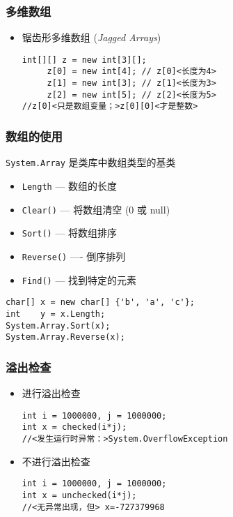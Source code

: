 \begin{frame}[fragile]
\frametitle{多维数组}
\begin{itemize}
\item 锯齿形多维数组 (\textit{Jagged Arrays})
\begin{lstlisting}[escapeinside=<>]
int[][] z = new int[3][];
     z[0] = new int[4]; // z[0]<长度为4>
     z[1] = new int[3]; // z[1]<长度为3>
     z[2] = new int[5]; // z[2]<长度为5>
//z[0]<只是数组变量；>z[0][0]<才是整数>

\end{lstlisting}
\end{itemize} \pause

  \begin{figure}[h] \label<1| handout:1>{fig:cs-array-rec}
    \centering 
  \end{figure}
\end{frame}

\begin{frame}[fragile]
\frametitle{数组的使用}
\texttt{System.Array} 是类库中数组类型的基类

\begin{itemize}
\item \texttt{Length} --- 数组的长度
\item \texttt{Clear()} --- 将数组清空 (0 或 null)
\item \texttt{Sort()} --- 将数组排序
\item \texttt{Reverse()} ---- 倒序排列
\item \texttt{Find()} --- 找到特定的元素
\end{itemize}
\begin{lstlisting}
char[] x = new char[] {'b', 'a', 'c'};
int    y = x.Length;
System.Array.Sort(x);
System.Array.Reverse(x);
\end{lstlisting}

\end{frame}

\begin{frame}[fragile]
\frametitle{溢出检查}
\begin{itemize}
\item 进行溢出检查
\begin{lstlisting}[escapeinside=<>]
int i = 1000000, j = 1000000;
int x = checked(i*j);
//<发生运行时异常：>System.OverflowException

\end{lstlisting}

\item 不进行溢出检查
\begin{lstlisting}[escapeinside=<>]
int i = 1000000, j = 1000000;
int x = unchecked(i*j);
//<无异常出现，但> x=-727379968

\end{lstlisting}
\end{itemize}
\end{frame}


